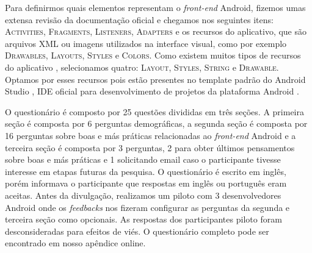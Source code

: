 

Para definirmos quais elementos representam o \textit{front-end} Android, fizemos umas extensa revisão da documentação oficial e chegamos nos seguintes itens: \textsc{Activities}, \textsc{Fragments}, \textsc{Listeners}, \textsc{Adapters} e os recursos do aplicativo, que são arquivos XML ou imagens utilizados na interface visual, como por exemplo \textsc{Drawables}, \textsc{Layouts}, \textsc{Styles} e \textsc{Colors}. Como existem muitos tipos de recursos do aplicativo \cite{AndroidResourcesOverview}, selecionamos quatro: \textsc{Layout}, \textsc{Styles}, \textsc{String} e \textsc{Drawable}. Optamos por esses recursos pois estão presentes no template padrão do Android Studio \cite{FirstApp2017}, IDE oficial para desenvolvimento de projetos da plataforma Android \cite{AndroidStudio}.

O questionário é composto por 25 questões divididas em três seções. A primeira seção é composta por 6 perguntas demográficas, a segunda seção é composta por 16 perguntas sobre boas e más práticas relacionadas ao \textit{front-end} Android e a terceira seção é composta por 3 perguntas, 2 para obter últimos pensamentos sobre boas e más práticas e 1 solicitando email caso o participante tivesse interesse em etapas futuras da pesquisa. O questionário é escrito em inglês, porém informava o participante que respostas em inglês ou português eram aceitas. Antes da divulgação, realizamos um piloto com 3 desenvolvedores Android onde os \textit{feedbacks} nos fizeram configurar as perguntas da segunda e terceira seção como opcionais. As respostas dos participantes piloto foram desconsideradas para efeitos de viés. O questionário completo pode ser encontrado em nosso apêndice online.


